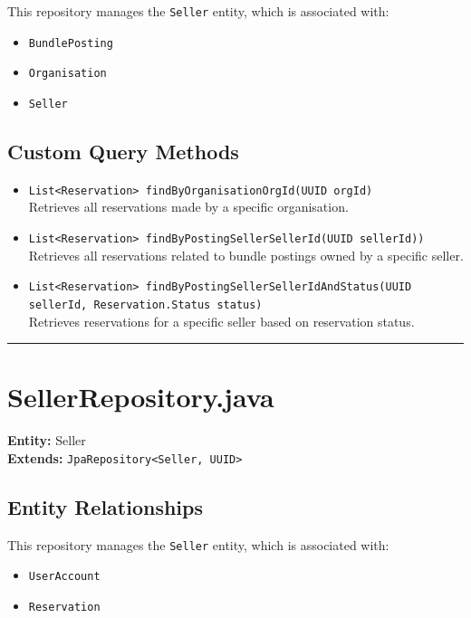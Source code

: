 \documentclass[12pt]{article}
\begin{document}
This repository manages the \texttt{Seller} entity, which is associated with:

\begin{itemize}
    \item \texttt{BundlePosting}
    \item \texttt{Organisation}
    \item \texttt{Seller}
\end{itemize}


\subsection*{Custom Query Methods}
\begin{itemize}
    \item \texttt{List<Reservation> findByOrganisationOrgId(UUID orgId)} \\
Retrieves all reservations made by a specific organisation.
    \item \texttt{List<Reservation> findByPostingSellerSellerId(UUID sellerId))} \\
 Retrieves all reservations related to bundle postings owned by a specific seller.    \item \texttt{List<Reservation> findByPostingSellerSellerIdAndStatus(UUID sellerId, Reservation.Status status)} \\
Retrieves reservations for a specific seller based on reservation status.  
\end{itemize}

\hrule
\vspace{1em}


\section{SellerRepository.java}

\textbf{Entity:} Seller \\
\textbf{Extends:} \texttt{JpaRepository<Seller, UUID>}

\subsection*{Entity Relationships}

This repository manages the \texttt{Seller} entity, which is associated with:

\begin{itemize}
    \item \texttt{UserAccount}
    \item \texttt{Reservation}
\end{itemize}
\end{document}

